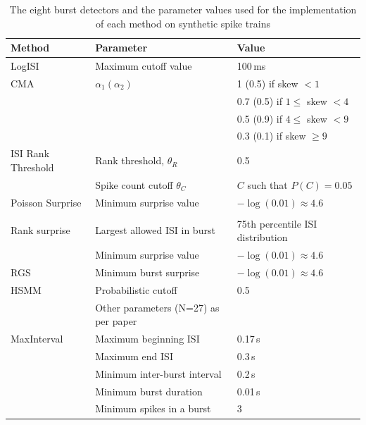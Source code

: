\documentclass[12pt, titlepage]{article}
\begin{document}
 \begin{table}[h]
 	\centering
 	\begin{tabular}{|p{3cm}|l|l|}
 		\hline
 		Method & Parameter & Value
 		\\ \hline 
 		\rowcolor{Gray} LogISI \cite{Pasquale2010} & Maximum cutoff value & 100$\,$ms
 		\\ \hline
 		CMA  & $\alpha_1 (\alpha_2)$ & 1 (0.5) if skew $<1$
 		\\ 
                \cite{Kapucu2012} & &  0.7 (0.5) if $1 \leq $ skew $<4$
 		\\ & & 0.5 (0.9) if $4 \leq $ skew $<9$
 		\\ & & 0.3 (0.1) if  skew $\geq 9$
 		\\ \hline 
 		\rowcolor{Gray}	ISI Rank Threshold  & Rank threshold, $\theta_R$ & 0.5 \\
                 \rowcolor{Gray}\cite{Hennig2011} & Spike count cutoff $\theta_C$& $C$ such that $P(C)=0.05 $
 		\\ \hline 
 		Poisson Surprise & Minimum surprise value & $-\log(0.01) \approx 4.6$
          \\
          \cite{Legendy1985}&&\\ \hline 
 		\rowcolor{Gray} Rank surprise& Largest allowed ISI in burst & 75th percentile ISI distribution\\
 		\rowcolor{Gray}\cite{Gourevitch2007} & Minimum surprise value& $-\log(0.01) \approx 4.6$
 		\\ \hline 
 		RGS \cite{Ko2012} & Minimum burst surprise & $-\log(0.01) \approx 4.6$
 		\\ \hline
 		\rowcolor{Gray} HSMM \cite{Tokdar2010} & Probabilistic cutoff & 0.5
 		\\ \rowcolor{Gray} & Other parameters (N=27) as per paper & 
 		\\ \hline
 		MaxInterval  & Maximum beginning ISI & 0.17$\,$s
 		\\ \cite{NEmanual} & Maximum end ISI & 0.3$\,$s
 		\\ & Minimum inter-burst interval & 0.2$\,$s
 		\\ & Minimum burst duration & 0.01$\,$s
 		\\& Minimum spikes in a burst & 3
 		\\ \hline
 	\end{tabular}
 	\caption{The eight burst detectors and the parameter values used for the implementation of each method on synthetic spike trains}
 	\label{param_vals}
 \end{table}
\end{document}
